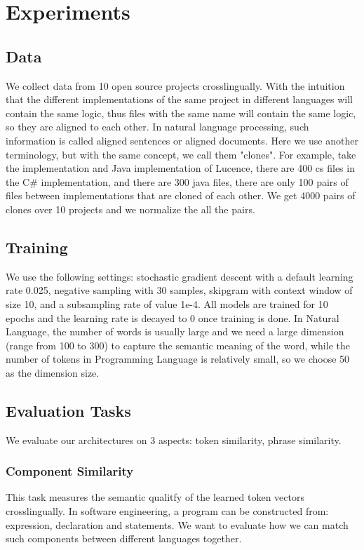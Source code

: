 \section{Experiments}
\subsection{Data}
We collect data from 10 open source projects crosslingually. With the intuition that the different implementations of the same project in different languages will contain the same logic, thus files with the same name will contain the same logic, so they are aligned to each other. In natural language processing, such information is called aligned sentences or aligned documents. Here we use another terminology, but with the same concept, we call them "clones". For example, take the  implementation and Java implementation of Lucence, there are 400 cs files in the C\# implementation, and there are 300 java files, there are only 100 pairs of files between implementations that are cloned of each other. We get 4000 pairs of clones over 10 projects and we normalize the all the pairs.
\subsection{Training}
We use the following settings: stochastic gradient descent with a default learning rate 0.025, negative sampling with 30 samples, skipgram with context window of size 10, and a subsampling rate of value 1e-4. All models are trained for 10 epochs and the learning rate is decayed to 0 once training is done. In Natural Language, the number of words is usually large and we need a large dimension (range from 100 to 300) to capture the semantic meaning of the word, while the number of tokens in Programming Language is relatively small, so we choose 50 as the dimension size.
\subsection{Evaluation Tasks}
We evaluate our architectures on 3 aspects: token similarity, phrase similarity.
\subsubsection{Component Similarity}
This task measures the semantic qualitfy of the learned token vectors crosslingually. In software engineering, a program can be constructed from: expression, declaration and statements. We want to evaluate how we can match such components between different languages together.
